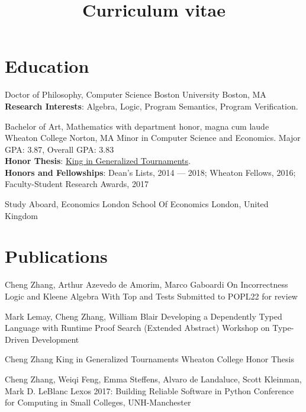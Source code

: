 \documentclass[11pt,a4paper,roman]{moderncv}        %
\title{Curriculum vitae}
\begin{document}

\makecvtitle{}

\setlength{\parskip}{2.5px}
\linespread{1.3}
\selectfont


\section{Education}

{Doctor of Philosophy, Computer Science} {}
{Boston University}
{Boston, MA}
{\textbf{Research Interests}:
Algebra, Logic, Program Semantics, Program Verification. }  %

{Bachelor of Art, Mathematics} {with department honor, magna cum laude}
{Wheaton College}
{Norton, MA}
{Minor in Computer Science and Economics.
Major GPA\@: 3.87, Overall GPA\@: 3.83\\
\textbf{Honor Thesis}: 
  \href{http://hdl.handle.net/11040/24570}{King in Generalized Tournaments}.\\
\textbf{Honors and Fellowships}: Dean's Lists, 2014 --- 2018;
Wheaton Fellows, 2016;
Faculty-Student Research Awards, 2017
}

{Study Aboard, Economics} {}
{London School Of Economics}
{London, United Kingdom}
{}  %



\section{Publications}

{Cheng Zhang, Arthur Azevedo de Amorim, Marco Gaboardi}
{On Incorrectness Logic and Kleene Algebra With Top and Tests}
{Submitted to POPL22 for review}
{}{}

{Mark Lemay, Cheng Zhang, William Blair}
{Developing a Dependently Typed Language with Runtime Proof Search (Extended Abstract)}
{Workshop on Type-Driven Development}
{}{}

{Cheng Zhang}
{King in Generalized Tournaments}
{Wheaton College Honor Thesis}
{}{}

{Cheng Zhang, Weiqi Feng, Emma Steffens, Alvaro de Landaluce, Scott Kleinman, Mark D. LeBlanc}
{Lexos 2017: Building Reliable Software in Python}
{Conference for Computing in Small Colleges, UNH-Manchester}
{}{}
\end{document}
